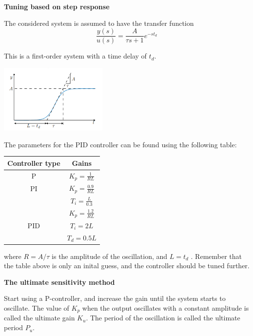 \textbf{Tuning based on step response}

The considered system is assumed to have the transfer function
$$\frac{y(s)}{u(s)} = \frac{A}{\tau s + 1} e^{-st_d}$$

This is a first-order system with a time delay of $t_d$.

\begin{center}
	\includegraphics[width=0.4\textwidth]{Images/zieglerTuning.png}
\end{center}


The parameters for the PID controller can be found using the following table:
\begin{table}[H]
	\centering
	\begin{tabular}{|c|c|}
		\hline
		\cellcolor[HTML]{C0C0C0} \textbf{Controller type} & \cellcolor[HTML]{C0C0C0}\textbf{Gains} \\ \hline
		P                                                 & $K_p=\frac{1}{RL}$                     \\ \hline
		PI                                                & $K_p=\frac{0.9}{RL}$                   \\
		                                                  & $T_i=\frac{L}{0.3}$                    \\ \hline
		                                                  & $K_p=\frac{1.2}{RL}$                   \\
		PID                                               & $T_i=2L$                               \\
		                                                  & $T_d=0.5L$                             \\ \hline
	\end{tabular}
\end{table}

where $R=A/\tau$ is the amplitude of the oscillation, and $L = t_d$ . Remember that the table above
is only an inital guess, and the controller should be tuned further.

\textbf{The ultimate sensitivity method}

Start using a P-controller, and increase the gain until the system starts to oscillate.
The value of $K_p$ when the output oscillates with a constant amplitude is called the ultimate gain $K_u$.
The period of the oscillation is called the ultimate period $P_u$.

